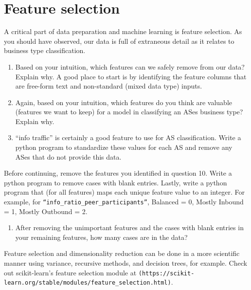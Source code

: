 \documentclass[11pt]{article}
\begin{document}
\section{Feature selection}
A critical part of data preparation and machine learning is feature selection.  As you should have observed, our data is full of extraneous detail as it relates to business type classification.  
\begin{enumerate}[resume]

\item Based on your intuition, which features can we safely remove from our data?  Explain why.  A good place to start is by identifying the feature columns that are free-form text and non-standard (mixed data type) inputs.

\item Again, based on your intuition, which features do you think are valuable (features we want to keep) for a model in classifying an ASes business type?  Explain why.

\item “info traffic” is certainly a good feature to use for AS classification.  Write a python program to standardize these values for each AS and remove any ASes that do not provide this data.
\end{enumerate}

\begin{flushleft}
Before continuing, remove the features you identified in question 10.  Write a python program to remove cases with blank entries.  Lastly, write a python program that (for all features) maps each unique feature value to an integer.  For example, for \verb|“info_ratio_peer_participants”|, Balanced = 0, Mostly Inbound = 1, Mostly Outbound = 2.
\end{flushleft}

\begin{enumerate}[resume]
\item After removing the unimportant features and the cases with blank entries in your remaining features, how many cases are in the data?
\end{enumerate}

\begin{flushleft}
Feature selection and dimensionality reduction can be done in a more scientific manner using variance, recursive methods, and decision trees, for example. 
Check out scikit-learn’s feature selection module at {\verb|(https://scikit-learn.org/stable/modules/feature_selection.html)|}.
\end{flushleft}
\end{document}

